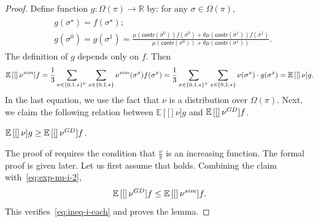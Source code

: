 \documentclass[10pt,a4paper]{amsart}
\newcommand{\E}[1]{\mathbb{E}\left[{#1}\right]}
\newcommand{\nug}{\nu^{\textnormal{GD}}}
\newcommand{\nus}{\nu^{\textnormal{sim}}}
\begin{document}
\begin{proof}
Define function $g:\Omega(\pi)\to \mathbb{R}$ by: for any $\sigma\in\Omega(\pi)$,
\begin{align}\label{def:g-i}
\begin{split}
&g(\sigma^\star)=f(\sigma^\star);\\
&g(\sigma^0)=g(\sigma^1)=\frac{ \mu(\textsf{contr}(\sigma^0))f(\sigma^0)+\theta \mu(\textsf{contr}(\sigma^1))f(\sigma^1)}{\mu(\textsf{contr}(\sigma^0))+\theta \mu(\textsf{contr}(\sigma^1))}. 
\end{split}
\end{align}
The definition of $g$ depends only on $f$. Then
\begin{align}\label{eq:exp-nu-i-2}
\E[\nus]{f} = \frac{1}{3} \sum_{\sigma\in \{0,1,\star\}^V}\sum_{x\in\{0,1,\star\} } \nus(\sigma^x)f(\sigma^x) = \frac{1}{3} \sum_{\sigma\in \{0,1,\star\}^V}\sum_{x\in\{0,1,\star\} } \nu(\sigma^x)\cdot g(\sigma^x) =  \E[\nu]{g}.
\end{align}
In the last equation, we use the fact that $\nu$ is a distribution over $\Omega(\pi)$.
Next, we claim the following relation between $\E[\nu]{g}$ and $\E[\nug]{f}$.
\begin{claim}\label{claim:g-i-f}
$\E[\nu]{g}\geq \E[\nug]{f}$.
\end{claim}
The proof of  requires the condition that $\frac{\nu}{\pi}$ is an increasing function. The formal proof is given later.
Let us first assume that  holds.
Combining the claim with~\eqref{eq:exp-nu-i-2},
\begin{align}\label{eq:ineq-i-each-2}
  \E[\nug]{f}\leq \E[\nus]{f}.
\end{align}
This verifies~\eqref{eq:ineq-i-each} and proves the lemma.
\end{proof}
\end{document}
